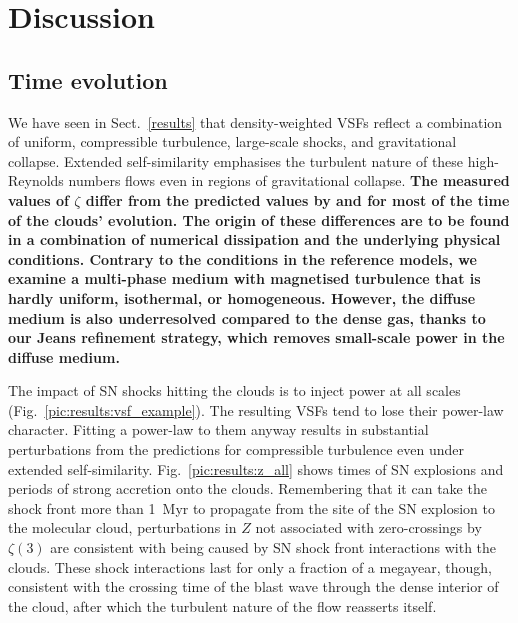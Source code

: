 \section{Discussion}\label{discussion}

\subsection{Time evolution}\label{discussion:normal}

We have seen in Sect.~\ref{results} that density-weighted VSFs reflect a combination of uniform, compressible turbulence, large-scale shocks, and gravitational collapse.  Extended self-similarity emphasises the turbulent nature of these high-Reynolds numbers flows even in regions of gravitational collapse. 
\textbf{
    The measured values of $\zeta$ differ from the predicted values by \citet{She1994} and \citet{Boldyrev2002} for most of the time of the clouds' evolution.
    The origin of these differences are to be found in a combination of numerical dissipation and the underlying physical conditions. 
    Contrary to the conditions in the reference models, we examine a multi-phase medium with magnetised turbulence that is hardly uniform, isothermal, or homogeneous.
    However, the diffuse medium is also underresolved compared to the dense gas, thanks to our Jeans refinement strategy, which removes small-scale power in the diffuse medium.
}

The impact of SN shocks hitting the clouds is to inject power at all scales (Fig.~\ref{pic:results:vsf_example}). 
The resulting VSFs tend to lose their power-law character. Fitting a power-law to them anyway results in substantial perturbations from the predictions for compressible turbulence even under extended self-similarity.
Fig.~\ref{pic:results:z_all} shows times of SN explosions and periods of strong accretion onto the clouds. 
Remembering that it can take the shock front more than 1~Myr to propagate from the site of the SN explosion to the molecular cloud, perturbations in $Z$ not associated with zero-crossings by $\zeta(3)$ are consistent with being caused by SN shock front interactions with the clouds.  
These shock interactions last for only a fraction of a megayear, though, consistent with the crossing time of the blast wave through the dense interior of the cloud, after which the turbulent nature of the flow reasserts itself.

